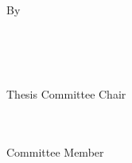 
\vspace*{\fill}

\begin{singlespace}
    \begin{center}
        \mytitle

        \bigskip
        
        By
        
        \bigskip
        
        \myname\\
        \mydegree
        
        \bigskip
        
        \mydepartment
        
        \vspace{0.75in}
        
        \underline{\hspace{4in}}\\
        \advisor\\
        Thesis Committee Chair
        
        \vspace{0.5in}
        
        \underline{\hspace{4in}}\\
        \committeeOne\\
        Committee Member
        
        \vspace{0.5in}
        
        
        \vspace{0.55in}
        
        
        
        
        
    \end{center}
\end{singlespace}

\vfill
\newpage
